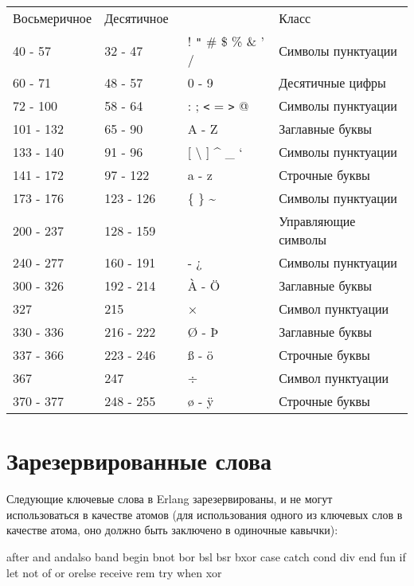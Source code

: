 \vspace*{12pt}
\begin{center}
\begin{tabular}{|>{\raggedright}p{52pt}|>{\raggedright}p{53pt}|>{\raggedright}p{103pt}|>{\raggedright}p{150pt}|}
\hline
\multicolumn{4}{|p{350pt}|}{Классы символов в кодировке}\tabularnewline
\hline
Восьме\-ричное & Деся\-тичное~ &   & Класс \tabularnewline
\hline
40 -  57 & 32 - 47 &  ! \texttt{"} \# \$ \% \& ' / & Символы пунктуации \tabularnewline
\hline
60 -  71 & 48 - 57 & 0 - 9 & Десятичные цифры \tabularnewline
\hline
72 - 100 & 58 - 64 & : ; \texttt{<} = \texttt{>} @ & Символы пунктуации \tabularnewline
\hline
101 - 132 &  65 - 90 & A - Z & Заглавные буквы \tabularnewline
\hline
133 - 140 &  91 - 96 & [ \textbackslash{} ] \textasciicircum{} \_ ` & Символы пунктуации \tabularnewline
\hline
141 - 172 &  97 - 122 & a  -  z & Строчные буквы \tabularnewline
\hline
173 - 176 & 123 - 126 & \{ \textbar{} \} \textasciitilde{} & Символы пунктуации \tabularnewline
\hline
200 - 237 & 128 - 159 ~ &   & Управляющие символы \tabularnewline
\hline
240 - 277 & 160 - 191 & - ¿  & Символы пунктуации \tabularnewline
\hline
300 - 326 & 192 - 214 & À - Ö  & Заглавные буквы \tabularnewline
\hline
327  & 215 & ×  & Символ пунктуации \tabularnewline
\hline
330 - 336 & 216 - 222 & Ø - Þ  & Заглавные буквы \tabularnewline
\hline
337 - 366 & 223 - 246 & ß - ö  & Строчные буквы \tabularnewline
\hline
367  & 247 & ÷  & Символ пунктуации \tabularnewline
\hline
370 - 377 & 248 - 255 & ø - ÿ  & Строчные буквы \tabularnewline
\hline
\end{tabular}
\end{center}


\section{Зарезервированные слова}


Следующие ключевые слова в Erlang зарезервированы, и не могут использоваться в
качестве атомов (для использования одного из ключевых слов в качестве атома,
оно должно быть заключено в одиночные кавычки):

\begin{erlang}
after and andalso band begin bnot bor bsl bsr bxor case 
catch cond div end fun if let not of or orelse receive 
rem try when xor
\end{erlang}
